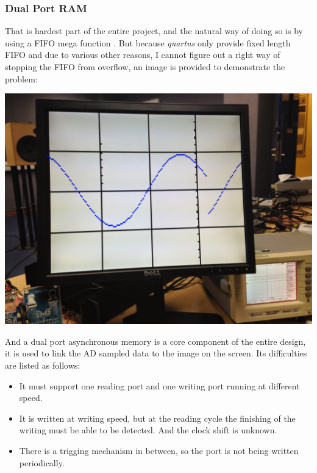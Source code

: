 \documentclass[11pt]{scrartcl}
\begin{document}
\subsubsection{Dual Port RAM}

That is hardest part of the entire project, and the natural way of doing so is by using a FIFO mega function \cite{fifo}. But because \textit{quartus} only provide fixed length FIFO and due to various other reasons, I cannot figure out a right way of stopping the FIFO from overflow, an image is provided to demonstrate the problem:


\begin{minipage}[t]{\linewidth}

{
\includegraphics[scale = 0.1]{IMG_1389.JPG}
}
\end{minipage}
\medskip

And a dual port asynchronous memory is a core component of the entire design, it is used to link the AD sampled data to the image on the screen. Its difficulties are listed as follows:
\begin{itemize}
    \item It must support one reading port and one writing port running at different speed.
    \item It is written at writing speed, but at the reading cycle the finishing of the writing must be able to be detected. And the clock shift is unknown. 
    \item There is a trigging mechanism in between, so the port is not being written periodically.
\end{itemize}
\end{document}
